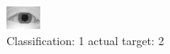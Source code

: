 \begin{figure}[h!]
\begin{center}
\includegraphics[width=0.60\columnwidth]{figures/ID874_class_1_target_2.png}
\end{center}
\caption{ Classification: 1 actual target: 2}
\label{fig:ID874_class_1_target_2}
\end{figure}
